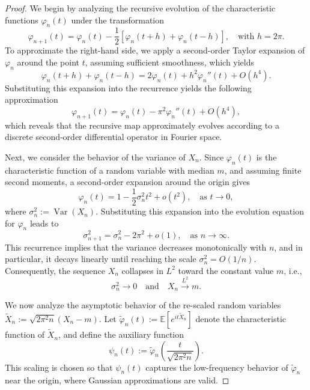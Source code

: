 \documentclass[sn-mathphys-num]{sn-jnl}%
\theoremstyle{thmstyleone}%
\theoremstyle{thmstyletwo}%
\theoremstyle{thmstylethree}%
\begin{document}
\begin{proof}
	We begin by analyzing the recursive evolution of the characteristic functions \( \varphi_n(t) \) under the transformation
	\begin{equation}
		\varphi_{n+1}(t) = \varphi_n(t) - \frac{1}{2} \left[ \varphi_n(t + h) + \varphi_n(t - h) \right], \quad \text{with } h = 2\pi.
	\end{equation}
	To approximate the right-hand side, we apply a second-order Taylor expansion of \( \varphi_n \) around the point \( t \), assuming sufficient smoothness, which yields
	\begin{equation}
		\varphi_n(t + h) + \varphi_n(t - h) = 2 \varphi_n(t) + h^2 \varphi_n''(t) + O(h^4).
	\end{equation}
	Substituting this expansion into the recurrence yields the following approximation
	\begin{equation}
		\varphi_{n+1}(t) = \varphi_n(t) - \pi^2 \varphi_n''(t) + O(h^4),
	\end{equation}
	which reveals that the recursive map approximately evolves according to a discrete second-order differential operator in Fourier space.
	
	Next, we consider the behavior of the variance of \( X_n \). Since \( \varphi_n(t) \) is the characteristic function of a random variable with median \( m \), and assuming finite second moments, a second-order expansion around the origin gives
	\begin{equation}
		\varphi_n(t) = 1 - \frac{1}{2} \sigma_n^2 t^2 + o(t^2), \quad \text{as } t \to 0,
	\end{equation}
	where \( \sigma_n^2 := \operatorname{Var}(X_n) \). Substituting this expansion into the evolution equation for \( \varphi_n \) leads to
	\begin{equation}
		\sigma_{n+1}^2 = \sigma_n^2 - 2\pi^2 + o(1), \quad \text{as } n \to \infty.
	\end{equation}
	This recurrence implies that the variance decreases monotonically with \( n \), and in particular, it decays linearly until reaching the scale \( \sigma_n^2 = O(1/n) \). Consequently, the sequence \( X_n \) collapses in \( L^2 \) toward the constant value \( m \), i.e.,
	\begin{equation}
		\sigma_n^2 \to 0 \quad \text{and} \quad X_n \xrightarrow{L^2} m.
	\end{equation}
	
	\noindent We now analyze the asymptotic behavior of the re-scaled random variables \( \widetilde{X}_n := \sqrt{2\pi^2 n}(X_n - m) \). Let \( \widetilde{\varphi}_n(t) := \mathbb{E}[e^{it \widetilde{X}_n}] \) denote the characteristic function of \( \widetilde{X}_n \), and define the auxiliary function
	\begin{equation}
		\psi_n(t) := \widetilde{\varphi}_n\left( \frac{t}{\sqrt{2\pi^2 n}} \right).
	\end{equation}
	This scaling is chosen so that \( \psi_n(t) \) captures the low-frequency behavior of \( \widetilde{\varphi}_n \) near the origin, where Gaussian approximations are valid.
	

\end{proof}
\end{document}
